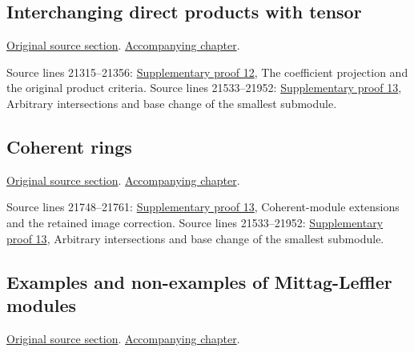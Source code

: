 \subsection{Interchanging direct products with tensor}
\hypertarget{algebra-source-section-products-tensor}{}
\noindent\href{https://github.com/stacks/stacks-project/blob/a04446e57ec1fbc252a871afcec7752fb2807b14/algebra.tex\#L21277}{Original source section}. \href{algebra.pdf\#nameddest=section-products-tensor}{Accompanying chapter}.

\begin{AlgebraSourceRoutes}
 Source lines 21315--21356: \hyperlink{algebra_ml_review_notes_20260927}{Supplementary proof 12}, The coefficient projection and the original product criteria.
 Source lines 21533--21952: \hyperlink{algebra_ml_coherent_notes_20260927}{Supplementary proof 13}, Arbitrary intersections and base change of the smallest submodule.
\end{AlgebraSourceRoutes}

\subsection{Coherent rings}
\hypertarget{algebra-source-section-coherent}{}
\noindent\href{https://github.com/stacks/stacks-project/blob/a04446e57ec1fbc252a871afcec7752fb2807b14/algebra.tex\#L21690}{Original source section}. \href{algebra.pdf\#nameddest=section-coherent}{Accompanying chapter}.

\begin{AlgebraSourceRoutes}
 Source lines 21748--21761: \hyperlink{algebra_ml_coherent_notes_20260927}{Supplementary proof 13}, Coherent-module extensions and the retained image correction.
 Source lines 21533--21952: \hyperlink{algebra_ml_coherent_notes_20260927}{Supplementary proof 13}, Arbitrary intersections and base change of the smallest submodule.
\end{AlgebraSourceRoutes}

\subsection{Examples and non-examples of Mittag-Leffler modules}
\hypertarget{algebra-source-section-examples}{}
\noindent\href{https://github.com/stacks/stacks-project/blob/a04446e57ec1fbc252a871afcec7752fb2807b14/algebra.tex\#L21852}{Original source section}. \href{algebra.pdf\#nameddest=section-examples}{Accompanying chapter}.

